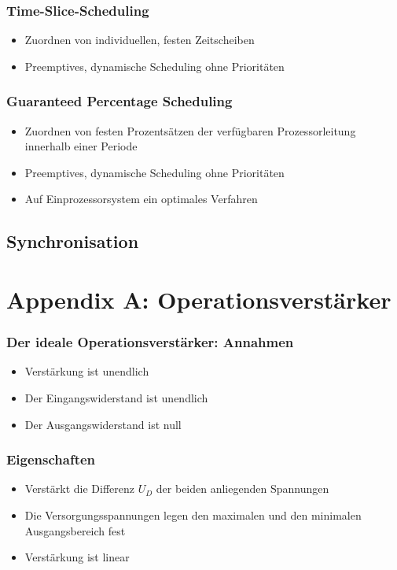 \subsubsection{Time-Slice-Scheduling}
\begin{itemize}
	\item Zuordnen von individuellen, festen Zeitscheiben
	\item Preemptives, dynamische Scheduling ohne Prioritäten
\end{itemize}

\subsubsection{Guaranteed Percentage Scheduling}
\begin{itemize}
	\item Zuordnen von festen Prozentsätzen der verfügbaren Prozessorleitung innerhalb einer Periode
	\item Preemptives, dynamische Scheduling ohne Prioritäten
	\item Auf Einprozessorsystem ein optimales Verfahren
\end{itemize}


\subsection{Synchronisation}



\section{Appendix A: Operationsverstärker}

\subsubsection{Der ideale Operationsverstärker: Annahmen}
\begin{itemize}
	\item Verstärkung ist unendlich
	\item Der Eingangswiderstand ist unendlich
	\item Der Ausgangswiderstand ist null
\end{itemize}

\subsubsection{Eigenschaften}
\begin{itemize}
	\item Verstärkt die Differenz $U_D$ der beiden anliegenden Spannungen
	\item Die Versorgungsspannungen legen den maximalen und den minimalen Ausgangsbereich fest
	\item Verstärkung ist linear
\end{itemize}

